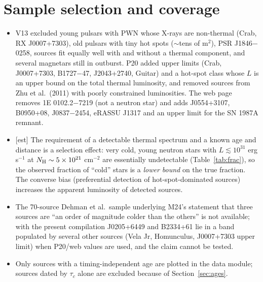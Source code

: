 \documentclass[11pt,a4paper]{article}
\newcommand{\src}[1]{\textsf{[#1]}}
\begin{document}
\section{Sample selection and coverage}
\begin{itemize}[leftmargin=1.2em,itemsep=0pt]
\item V13 excluded young pulsars with PWN whose X-rays are non-thermal (Crab, RX J0007+7303), old pulsars with tiny hot spots ($\sim$tens of m$^2$), PSR J1846$-$0258, sources fit equally well with and without a thermal component, and several magnetars still in outburst. P20 added upper limits (Crab, J0007+7303, B1727$-$47, J2043+2740, Guitar) and a hot-spot class whose $L$ is an upper bound on the total thermal luminosity, and removed sources from Zhu et al.\ (2011) with poorly constrained luminosities. The web page removes 1E 0102.2$-$7219 (not a neutron star) and adds J0554+3107, B0950+08, J0837$-$2454, eRASSU J1317 and an upper limit for the SN 1987A remnant.
\item \src{est} The requirement of a detectable thermal spectrum and a known age and distance is a selection effect: very cold, young neutron stars with $L\lesssim10^{31}$ erg\,s$^{-1}$ at $N_{\rm H}\sim5\times10^{21}$ cm$^{-2}$ are essentially undetectable (Table~\ref{tab:frac}), so the observed fraction of ``cold'' stars is a \emph{lower bound} on the true fraction. The converse bias (preferential detection of hot-spot-dominated sources) increases the apparent luminosity of detected sources.
\item The 70-source Dehman et al.\ sample underlying M24's statement that three sources are ``an order of magnitude colder than the others'' is not available; with the present compilation J0205+6449 and B2334+61 lie in a band populated by several other sources (Vela Jr, Homunculus, J0007+7303 upper limit) when P20/web values are used, and the claim cannot be tested.
\item Only sources with a timing-independent age are plotted in the data module; sources dated by $\tau_c$ alone are excluded because of Section~\ref{sec:ages}.
\end{itemize}
\end{document}
